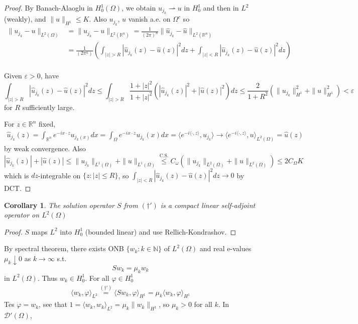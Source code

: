 \documentclass{article}
\newcommand{\e}{\varepsilon}
\theoremstyle{definition}
\theoremstyle{remark}
\theoremstyle{plain}
\newtheorem{crly}[defn]{Corollary}
\newcommand{\NN}{\mathbb{N}}
\newcommand{\RR}{\mathbb{R}}
\newcommand{\calD}{\mathcal{D}}
\begin{document}
\begin{proof}
    By Banach-Alaoglu in $H_0^1(\Omega)$, we obtain $u_{j_k}\rightharpoonup u$ in $H_0^1$ and then in $L^2$ (weakly), and $\|u\|_{H^1}\le K$. Also $u_{j_k}$, $u$ vanish a.e. on $\Omega^c$ so \begin{align*}\|u_{j_k}-u\|_{L^2(\Omega)}&=\|u_{j_k}-u\|_{L^2(\RR^n)}=\frac{1}{(2\pi)^n}\|\hat u_{j_k}-\hat u\|_{L^2(\RR^n)}\\ &=\frac{1}{(2\pi^n)}\left(\int_{|z|>R}|\hat u_{j_k}(z)-\hat u(z)|^2dz+\int_{|z|<R}|\hat u_{j_k}(z)-\hat u(z)|^2dz\right)\\ \end{align*}
    
    Given $\e>0$, have
    \[\int_{|z|>R}|\hat u_{j_k}(z)-\hat u(z)|^2dz\le\int_{|z|>R}\frac{1+|z|^2}{1+|z|^2}(|\hat u_{j_k}(z)|^2+|\hat u(z)|^2)dz\le \frac{2}{1+R^2}(\|u_{j_k}\|_{H^1}^2+\|u\|_{H^1}^2)<\e\] for $R$ sufficiently large.
    
    For $z\in \RR^n$ fixed,
    \begin{align*}
        \hat u_{j_k}(z)=\int_{\RR^n}e^{-ix\cdot z}u_{j_k(x)}dx=\int_{\Omega}e^{-ix\cdot z}u_{j_k}(x)dx=\langle e^{-i\langle\cdot,z\rangle},u_{j_k}\rangle\to \langle e^{-i\langle\cdot,z\rangle},u\rangle_{L^2(\Omega)}=\hat u(z)
    \end{align*}
    by weak convergence. Also \[|\hat u_{j_k}(z)|+|\hat u(z)|\le \|u_{j_k}\|_{L^1(\Omega)}+\|u\|_{L^1(\Omega)}\overset{\text{C.S.}}{\le}C_\omega(\|u_{j_k}\|_{L^2(\Omega)}+\|u\|_{L^2(\Omega)})\le 2C_\Omega K\] which is $dz$-integrable on $\{z:|z|\le R\}$, so $\int_{|z|<R}|\hat u_{j_k}(z)-\hat u(z)|^2dz\to 0$ by DCT.
\end{proof}
\begin{crly}
    The solution operator $S$ from $(\dagger')$ is a compact linear self-adjoint operator on $L^2(\Omega)$
\end{crly}
\begin{proof}
    $S$ maps $L^2$ into $H_0^1$ (bounded linear) and use Rellich-Kondrashov.
\end{proof}
By spectral theorem, there exists ONB $\{w_k:k\in\NN\}$ of $L^2(\Omega)$ and real e-values $\mu_k\downarrow 0$ as $k\to\infty$ s.t. \[Sw_k=\mu_kw_k\] in $L^2(\Omega)$. Thus $w_k\in H_0^1$. For all $\varphi\in H_0^1$
\begin{align*}
    \langle w_k,\varphi\rangle_{L^2}\overset{(\dagger')}{=}\langle Sw_k,\varphi\rangle_{H^1}=\mu_k\langle w_k,\varphi\rangle_{H^1}
\end{align*} Tes $\varphi=w_k$, see that $1=\langle w_k,w_k\rangle_{L^2}=\mu_k\|w_k\|_{H^1}$, so $\mu_k>0$ for all $k$. In $\calD'(\Omega)$,
\end{document}
